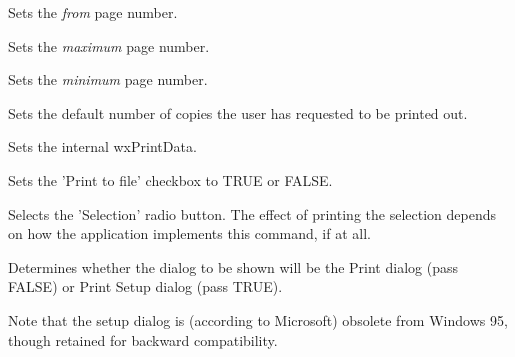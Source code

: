 
Sets the {\it from} page number.

\label{wxprintdialogdatasetmaxpage}


Sets the {\it maximum} page number.

\label{wxprintdialogdatasetminpage}


Sets the {\it minimum} page number.

\label{wxprintdialogdatasetnocopies}


Sets the default number of copies the user has requested to be printed out.

\label{wxprintdialogdatasetprintdata}


Sets the internal wxPrintData.

\label{wxprintdialogdatasetprinttofile}


Sets the 'Print to file' checkbox to TRUE or FALSE.

\label{wxprintdialogdatasetselection}


Selects the 'Selection' radio button. The effect of printing the selection depends on how the application
implements this command, if at all.

\label{wxprintdialogdatasetsetupdialog}


Determines whether the dialog to be shown will be the Print dialog
(pass FALSE) or Print Setup dialog (pass TRUE).

Note that the setup dialog is (according to Microsoft) obsolete from
Windows 95, though retained for backward compatibility.

